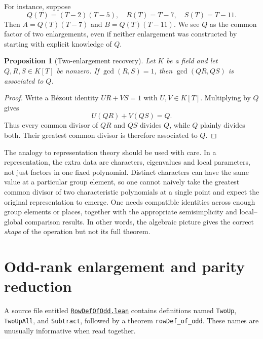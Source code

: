 \documentclass[11pt,openany,oneside]{scrbook}
\newtheorem{proposition}[theorem]{Proposition}
\theoremstyle{definition}
\theoremstyle{remark}
\newcommand{\baseurl}{https://github.com/CocoSgt/riemann-hypothesis-lean/blob/7cbf7a0c32fca1badf05931879a37c3f8a2b03b4/}
\newcommand{\sourcefile}[2]{\href{\baseurl#1}{\texttt{#2}}}
\begin{document}
For instance, suppose
\[
Q(T)=(T-2)(T-5),\quad
R(T)=T-7,\quad S(T)=T-11.
\]
Then $A=Q(T)(T-7)$ and $B=Q(T)(T-11)$. We see $Q$ as the common factor of two enlargements, even if neither enlargement was constructed by starting with explicit knowledge of $Q$.

\begin{proposition}[Two-enlargement recovery]\label{prop:gcd}
Let $K$ be a field and let $Q,R,S\in K[T]$ be nonzero. If $\gcd(R,S)=1$, then $\gcd(QR,QS)$ is associated to $Q$.
\end{proposition}
\begin{proof}
Write a B\'ezout identity $UR+VS=1$ with $U,V\in K[T]$. Multiplying by $Q$ gives
\[
U(QR)+V(QS)=Q.
\]
Thus every common divisor of $QR$ and $QS$ divides $Q$, while $Q$ plainly divides both. Their greatest common divisor is therefore associated to $Q$.
\end{proof}

The analogy to representation theory should be used with care. In a representation, the extra data are characters, eigenvalues and local parameters, not just factors in one fixed polynomial. Distinct characters can have the same value at a particular group element, so one cannot naively take the greatest common divisor of two characteristic polynomials at a single point and expect the original representation to emerge. One needs compatible identities across enough group elements or places, together with the appropriate semisimplicity and local--global comparison results. In other words, the algebraic picture gives the correct \emph{shape} of the operation but not its full theorem.

\section{Odd-rank enlargement and parity reduction}
A source file entitled \sourcefile{src/Development/AutomorphicArithmetic/Foundations/GaloisRepresentations/ThetaParseval/SplitLineSubtraction/RowDefOfOdd.lean}{RowDefOfOdd.lean} contains definitions named \texttt{TwoUp}, \texttt{TwoUpAll}, and \texttt{Subtract}, followed by a theorem \texttt{rowDef\_of\_odd}. These names are unusually informative when read together.
\end{document}

